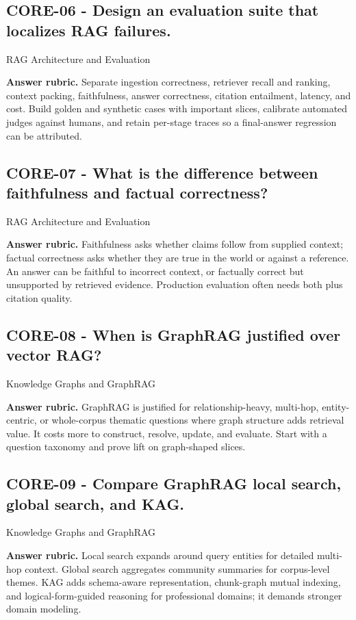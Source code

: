 \subsection*{CORE-06 - Design an evaluation suite that localizes RAG failures.}
 \quad RAG Architecture and Evaluation
\par\smallskip\textbf{Answer rubric.} Separate ingestion correctness, retriever recall and ranking, context packing, faithfulness, answer correctness, citation entailment, latency, and cost. Build golden and synthetic cases with important slices, calibrate automated judges against humans, and retain per-stage traces so a final-answer regression can be attributed.
\subsection*{CORE-07 - What is the difference between faithfulness and factual correctness?}
 \quad RAG Architecture and Evaluation
\par\smallskip\textbf{Answer rubric.} Faithfulness asks whether claims follow from supplied context; factual correctness asks whether they are true in the world or against a reference. An answer can be faithful to incorrect context, or factually correct but unsupported by retrieved evidence. Production evaluation often needs both plus citation quality.
\subsection*{CORE-08 - When is GraphRAG justified over vector RAG?}
 \quad Knowledge Graphs and GraphRAG
\par\smallskip\textbf{Answer rubric.} GraphRAG is justified for relationship-heavy, multi-hop, entity-centric, or whole-corpus thematic questions where graph structure adds retrieval value. It costs more to construct, resolve, update, and evaluate. Start with a question taxonomy and prove lift on graph-shaped slices.
\subsection*{CORE-09 - Compare GraphRAG local search, global search, and KAG.}
 \quad Knowledge Graphs and GraphRAG
\par\smallskip\textbf{Answer rubric.} Local search expands around query entities for detailed multi-hop context. Global search aggregates community summaries for corpus-level themes. KAG adds schema-aware representation, chunk-graph mutual indexing, and logical-form-guided reasoning for professional domains; it demands stronger domain modeling.
